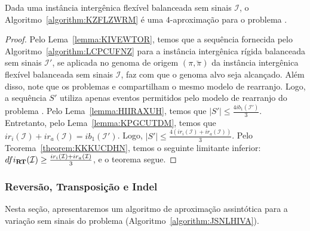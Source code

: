 \begin{theorem}\label{theorem:DSCDQRUP}
Dada uma instância intergênica flexível balanceada sem sinais $\mathcal{I}$, o Algoritmo~\ref{algorithm:KZFLZWRM} é uma $4$-aproximação para o problema \SbFIRT{}.
\end{theorem}
\begin{proof}
Pelo Lema~\ref{lemma:KIVEWTOR}, temos que a sequência fornecida pelo Algoritmo~\ref{algorithm:LCPCUFNZ} para a instância intergênica rígida balanceada sem sinais $\mathcal{I'}$, se aplicada no genoma de origem $(\pi,\breve\pi)$ da instância intergênica flexível balanceada sem sinais $\mathcal{I}$, faz com que o genoma alvo seja alcançado. Além disso, note que os problemas \SbIRT{} e \SbFIRT{} compartilham o mesmo modelo de rearranjo. Logo, a sequência $S'$ utiliza apenas eventos permitidos pelo modelo de rearranjo do problema \SbFIRT{}. Pelo Lema~\ref{lemma:HIIRAXUH}, temos que $|S'| \le \frac{4ib_1(\mathcal{I}')}{3}$. Entretanto, pelo Lema~\ref{lemma:KPGCUTDM}, temos que $ir_i(\mathcal{I}) + ir_a(\mathcal{I}) = ib_1(\mathcal{I'})$. Logo, $|S'| \le \frac{4(ir_i(\mathcal{I}) + ir_a(\mathcal{I}))}{3}$. Pelo Teorema~\ref{theorem:KKKUCDHN}, temos o seguinte limitante inferior: $dfi_{\textbf{RT}}(\mathcal{I}) \ge \frac{ir_i(\mathcal{I}) + ir_a(\mathcal{I})}{3}$, e o teorema segue.
\end{proof}

\subsubsection{Reversão, Transposição e Indel}

Nesta seção, apresentaremos um algoritmo de aproximação assintótica para a variação sem sinais do problema \SbFIRTI{} (Algoritmo~\ref{algorithm:JSNLHIVA}).



